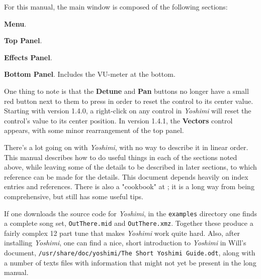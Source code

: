 \documentclass[
 11pt,
 twoside,
 a4paper,
 final                                 %
]{article}
\begin{document}
   For this manual, the main window is composed of the following sections:

\begin{enumber}
   \item \textbf{Menu}.
   \item \textbf{Top Panel}.
   \item \textbf{Effects Panel}.
   \item \textbf{Bottom Panel}.  Includes the VU-meter at the bottom.
\end{enumber}

   One thing to note is that the \textbf{Detune} and \textbf{Pan} buttons no
   longer have a small red button next to them to press in order to reset the
   control to its center value.  Starting with version 1.4.0, a right-click on
   any control in \textsl{Yoshimi} will reset the control's value to its center
   position.  In version 1.4.1, the \textbf{Vectors} control appears, with some
   minor rearrangement of the top panel.

   There's a lot going on with \textsl{Yoshimi}, with no way to describe
   it in linear order.  This manual describes how to do useful things in
   each of the sections noted above, while leaving some of the details to be
   described in later sections, to which reference can be made for the details.
   This document depends heavily on index entries and references.
   There is also a "cookbook" at \cite{book}; it is a long way from being
   comprehensive, but still has some useful tips.

   If one downloads the source code for \textsl{Yoshimi}, in the
   \texttt{examples} directory one finds a complete song set,
   \texttt{OutThere.mid} and \texttt{OutThere.xmz}. Together these produce a
   fairly complex 12 part tune that makes \textsl{Yoshimi} work quite hard.
   Also, after installing \textsl{Yoshimi}, one can find a nice, short
   introduction to \textsl{Yoshimi} in Will's document,
   \texttt{/usr/share/doc/yoshimi/The Short Yoshimi Guide.odt},
   along with a number of texts files with information that might not yet be
   present in the long manual.

\rhead{\rightmark}         %






\end{document}
